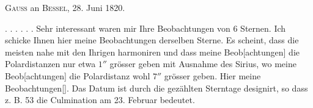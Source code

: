 \clearpage\begingroup
\hypertarget{native-328b}{}\HistoricalFoot{}{41\textsuperscript{*}}
\begin{center}\textsc{Gauss} an \textsc{Bessel}, 28. Juni 1820.\end{center}
\noindent\hspace*{\parindent}. . . . . . Sehr interessant waren mir Ihre Beobachtungen von 6 Sternen. Ich schicke Ihnen hier meine Beobachtungen derselben Sterne. Es scheint, dass die meisten nahe mit den Ihrigen harmoniren und dass meine Beob[achtungen] die Polardistanzen nur etwa \(1''\) grösser geben mit Ausnahme des Sirius, wo meine Beob[achtungen] die Polardistanz wohl \(7''\) grösser geben.
\clearpage{}
\noindent Hier meine Beobachtungen[\begingroup\renewcommand{\thefootnote}{*)}\footnotemark\renewcommand{\thefootnote}{[*)}\footnotetext{Scheinbare Örter.]}\endgroup]. Das Datum ist durch die gezählten Sterntage designirt, so dass z. B. 53 die Culmination am 23. Februar bedeutet.

